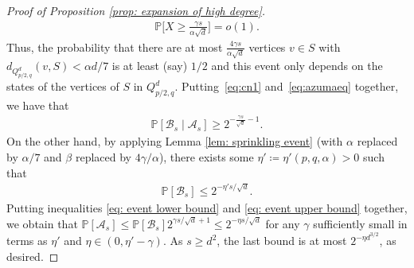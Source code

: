 \documentclass{article}
\theoremstyle{definition}
\newcommand{\cA}{\mathcal{A}}
\newcommand{\cB}{\mathcal{B}}
\begin{document}
\begin{proof}[Proof of Proposition \ref{prop: expansion of high degree}]
    \begin{equation}\label{eq:azumaeq}
    \begin{split}
    \mathbb P\bigg[X\ge \frac{\gamma s}{\alpha \sqrt{d}}\bigg] = o(1).
    \end{split}
    \end{equation}
    Thus, the probability that there are at most $\frac{4\gamma s}{\alpha \sqrt{d}}$ vertices $v\in S$ with $d_{Q^d_{p/2,q}}(v,S)<\alpha d/7$ is at least (say) $1/2$ and this event only depends on the states of the vertices of $S$ in $Q^d_{p/2,q}$.
    Putting~\eqref{eq:cn1} and~\eqref{eq:azumaeq} together, we have that 
    \begin{align}
        \mathbb P[\mathcal{B}_s\mid \mathcal{A}_s]\ge 2^{-\frac{\gamma s}{\sqrt{d}}-1}.\label{eq: event lower bound}
    \end{align}
    On the other hand, by applying Lemma \ref{lem: sprinkling event} (with $\alpha$ replaced by $\alpha/7$ and $\beta$ replaced by $4\gamma/\alpha$), there exists some $\eta'\coloneqq \eta'(p,q,\alpha)>0$ such that
    \begin{align}
        \mathbb P[\mathcal{B}_s]\le 2^{-\eta' s/\sqrt{d}}. \label{eq: event upper bound}
    \end{align}
    Putting inequalities \eqref{eq: event lower bound} and \eqref{eq: event upper bound} together, we obtain that $\mathbb P[\cA_s]\le \mathbb P[\cB_s]2^{\gamma s/\sqrt{d}+1}\le 2^{-\eta s/\sqrt{d}}$ for any $\gamma$ sufficiently small in terms as $\eta'$ and $\eta\in (0,\eta'-\gamma)$. As $s\ge d^2$, the last bound is at most $2^{-\eta d^{3/2}}$, as desired.
\end{proof}
\end{document}
